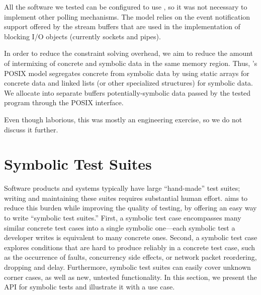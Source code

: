   All the software we tested can be configured to use , so it was not necessary to implement other polling mechanisms.  The  model relies on the event notification support offered by the stream buffers that are used in the implementation of blocking I/O objects (currently sockets and pipes).

  In order to reduce the constraint solving overhead, we aim to reduce the amount of intermixing of concrete and symbolic data in the same memory region.  Thus, \cnine's POSIX model segregates concrete from symbolic data by using static arrays for concrete data and linked lists (or other specialized structures) for symbolic data.  We allocate into separate buffers potentially-symbolic data passed by the tested program through the POSIX interface.

  Even though laborious, this was mostly an engineering exercise, so we do not discuss it further.



\section{Symbolic Test Suites}

Software products and systems typically have large ``hand-made'' test suites; writing and maintaining these suites requires substantial human effort.  \cnine aims to reduce this burden while improving the quality of testing, by offering an easy way to write ``symbolic test suites.'' First, a symbolic test case encompasses many similar concrete test cases into a single symbolic one---each symbolic test a developer writes is equivalent to many concrete ones.  Second, a symbolic test case explores conditions that are hard to produce reliably in a concrete test case, such as the occurrence of faults, concurrency side effects, or network packet reordering, dropping and delay.  Furthermore, symbolic test suites can easily cover unknown corner cases, as well as new, untested functionality.  In this section, we present the API for symbolic tests and illustrate it with a use case.

